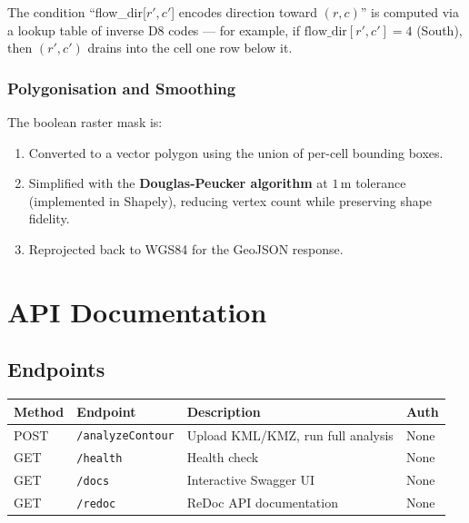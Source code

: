 \documentclass[12pt,a4paper]{article}
\begin{document}
The condition ``flow\_dir[$r', c'$] encodes direction toward $(r, c)$'' is computed via
a lookup table of inverse D8 codes --- for example, if $\text{flow\_dir}[r',c'] = 4$
(South), then $(r', c')$ drains into the cell one row below it.

\subsubsection{Polygonisation and Smoothing}
The boolean raster mask is:
\begin{enumerate}
    \item Converted to a vector polygon using the union of per-cell bounding boxes.
    \item Simplified with the \textbf{Douglas-Peucker algorithm} at $1\,\text{m}$
          tolerance (implemented in Shapely), reducing vertex count while preserving
          shape fidelity.
    \item Reprojected back to WGS84 for the GeoJSON response.
\end{enumerate}

\section{API Documentation}

\subsection{Endpoints}

\begin{center}
\begin{tabular}{llll}
    \toprule
    \textbf{Method} & \textbf{Endpoint}        & \textbf{Description}              & \textbf{Auth} \\
    \midrule
    POST & \texttt{/analyzeContour}  & Upload KML/KMZ, run full analysis  & None \\
    GET  & \texttt{/health}          & Health check                        & None \\
    GET  & \texttt{/docs}            & Interactive Swagger UI              & None \\
    GET  & \texttt{/redoc}           & ReDoc API documentation             & None \\
    \bottomrule
\end{tabular}
\end{center}
\end{document}
